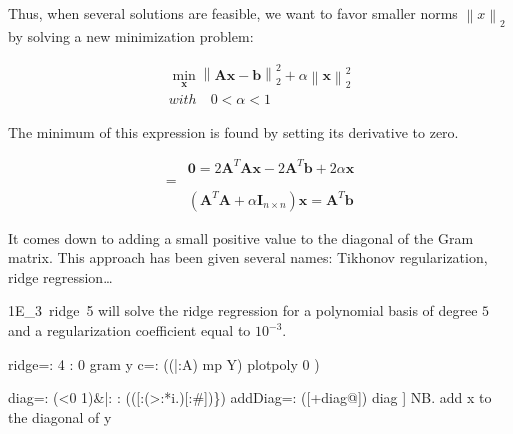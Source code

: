 \documentclass[10pt]{article}%
\renewcommand{\vec}[1]{\boldsymbol{#1}}
\newcommand{\norm}[1]{\left\lVert#1\right\rVert}
\begin{document}
Thus, when several solutions are feasible, we want to favor smaller
norms $\norm{x}_2$ by solving a new minimization problem:

\begin{align*}
\min_{\vec{x}} \norm{\vec{A}\vec{x}-\vec{b}}^2_2 + \alpha \norm{\vec{x}}^2_2 \\
with \quad 0 < \alpha < 1
\end{align*}

The minimum of this expression is found by setting its derivative to zero.

\begin{align*}
 & \vec{0} = 2\vec{A}^T\vec{A}\vec{x} - 2\vec{A}^T\vec{b} + 2\alpha\vec{x} \\
=& \\
 & \left( \vec{A}^T\vec{A} + \alpha \vec{I}_{n\times n} \right) \vec{x} = \vec{A}^T \vec{b}
\end{align*}

It comes down to adding a small positive value to the diagonal of the
Gram matrix. This approach has been given several names: Tikhonov regularization,
ridge regression\dots

{\Tt{}1E{\_}3\ ridge\ 5\nwendquote} will solve the ridge regression for a polynomial basis of
degree $5$ and a regularization coefficient equal to $10^{-3}$.

\nwenddocs{}\endmoddef\nwstartdeflinemarkup{}\nwenddeflinemarkup
ridge=: 4 : 0
  gram y
  c=: ((|:A) mp Y) %
  plotpoly 0
)

\nwendcode{}\plusendmoddef\nwstartdeflinemarkup{}\nwenddeflinemarkup
diag=: (<0 1)&|: : (([:(>:*i.)[:#])\})
addDiag=: ([+diag@]) diag ] NB. add x to the diagonal of y
\end{document}

